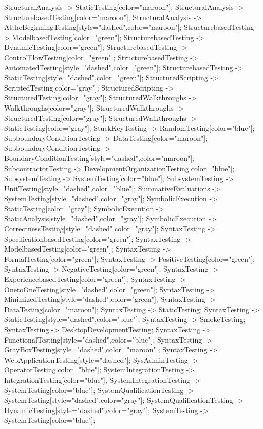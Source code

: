 \documentclass{article}
\begin{document}
{StructuralAnalysis -> StaticTesting[color="maroon"];
StructuralAnalysis -> StructurebasedTesting[color="maroon"];
StructuralAnalysis -> AttheBeginningTesting[style="dashed",color="maroon"];
StructurebasedTesting -> ModelbasedTesting[color="green"];
StructurebasedTesting -> DynamicTesting[color="green"];
StructurebasedTesting -> ControlFlowTesting[color="green"];
StructurebasedTesting -> AutomatedTesting[style="dashed",color="green"];
StructurebasedTesting -> StaticTesting[style="dashed",color="green"];
StructuredScripting -> ScriptedTesting[color="gray"];
StructuredScripting -> StructuredTesting[color="gray"];
StructuredWalkthroughs -> Walkthroughs[color="gray"];
StructuredWalkthroughs -> StructuredTesting[color="gray"];
StructuredWalkthroughs -> StaticTesting[color="gray"];
StuckKeyTesting -> RandomTesting[color="blue"];
SubboundaryConditionTesting -> DataTesting[color="maroon"];
SubboundaryConditionTesting -> BoundaryConditionTesting[style="dashed",color="maroon"];
SubcontractorTesting -> DevelopmentOrganizationTesting[color="blue"];
SubsystemTesting -> SystemTesting[color="blue"];
SubsystemTesting -> UnitTesting[style="dashed",color="blue"];
SummativeEvaluations -> SystemTesting[style="dashed",color="gray"];
SymbolicExecution -> StaticTesting[color="gray"];
SymbolicExecution -> StaticAnalysis[style="dashed",color="gray"];
SymbolicExecution -> CorrectnessTesting[style="dashed",color="gray"];
SyntaxTesting -> SpecificationbasedTesting[color="green"];
SyntaxTesting -> ModelbasedTesting[color="green"];
SyntaxTesting -> FormalTesting[color="green"];
SyntaxTesting -> PositiveTesting[color="green"];
SyntaxTesting -> NegativeTesting[color="green"];
SyntaxTesting -> ExperiencebasedTesting[color="green"];
SyntaxTesting -> OnetoOneTesting[style="dashed",color="green"];
SyntaxTesting -> MinimizedTesting[style="dashed",color="green"];
SyntaxTesting -> DataTesting[color="maroon"];
SyntaxTesting -> StaticTesting;
SyntaxTesting -> StaticTesting[style="dashed",color="blue"];
SyntaxTesting -> SmokeTesting;
SyntaxTesting -> DesktopDevelopmentTesting;
SyntaxTesting -> FunctionalTesting[style="dashed",color="blue"];
SyntaxTesting -> GrayBoxTesting[style="dashed",color="maroon"];
SyntaxTesting -> WebApplicationTesting[style="dashed"];
SysAdminTesting -> OperatorTesting[color="blue"];
SystemIntegrationTesting -> IntegrationTesting[color="blue"];
SystemIntegrationTesting -> SystemTesting[color="blue"];
SystemQualificationTesting -> SystemTesting[style="dashed",color="gray"];
SystemQualificationTesting -> DynamicTesting[style="dashed",color="gray"];
SystemTesting -> SystemTesting[color="blue"];
}
\end{document}
